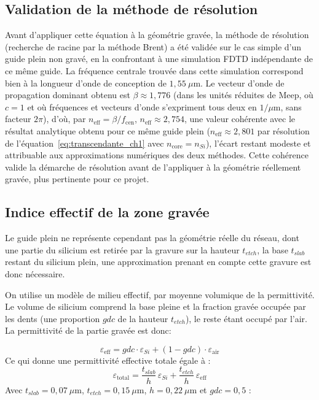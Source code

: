 \documentclass[a4paper,11pt]{report}
\begin{document}
\subsection*{Validation de la méthode de résolution}

Avant d'appliquer cette équation à la géométrie gravée, la méthode de résolution (recherche de racine par la méthode Brent) a été validée sur le cas simple d'un guide plein non gravé, en la confrontant à une simulation FDTD indépendante de ce même guide. La fréquence centrale trouvée dans cette simulation correspond bien à la longueur d'onde de conception de $1{,}55~\mu\text{m}$. Le vecteur d'onde de propagation dominant obtenu est $\beta \approx 1{,}776$ (dans les unités réduites de Meep, où $c=1$ et où fréquences et vecteurs d'onde s'expriment tous deux en $1/\mu\text{m}$, sans facteur $2\pi$), d'où, par $n_{\text{eff}} = \beta/f_{\text{cen}}$, $n_{\text{eff}} \approx 2{,}754$, une valeur cohérente avec le résultat analytique obtenu pour ce même guide plein ($n_{\text{eff}}\approx2{,}801$ par résolution de l'équation~\eqref{eq:transcendante_ch1} avec $n_{\text{core}}=n_{Si}$), l'écart restant modeste et attribuable aux approximations numériques des deux méthodes. Cette cohérence valide la démarche de résolution avant de l'appliquer à la géométrie réellement gravée, plus pertinente pour ce projet.

\subsection*{Indice effectif de la zone gravée}

Le guide plein ne représente cependant pas la géométrie réelle du réseau, dont une partie du silicium est retirée par la gravure sur la hauteur $t_{etch}$, la base $t_{slab}$ restant du silicium plein, une approximation prenant en compte cette gravure est donc nécessaire.

On utilise un modèle de milieu effectif, par moyenne volumique de la permittivité. Le volume de silicium comprend la base pleine et la fraction gravée occupée par les dents (une proportion $gdc$ de la hauteur $t_{etch}$), le reste étant occupé par l'air. La permittivité de la partie gravée est donc:

\begin{equation}
\varepsilon_{\text{eff}} = gdc\cdot\varepsilon_{Si} + (1-gdc)\cdot\varepsilon_{\text{air}}
\end{equation}
Ce qui donne une permittivité effective totale égale à :
\begin{equation}
\varepsilon_{\text{total}} = \frac{t_{slab}}{h}\,\varepsilon_{Si} + \frac{t_{etch}}{h}\,\varepsilon_{\text{eff}}
\end{equation}
Avec $t_{slab}=0{,}07~\mu\text{m}$, $t_{etch}=0{,}15~\mu\text{m}$, $h=0{,}22~\mu\text{m}$ et $gdc=0{,}5$ :
\end{document}
